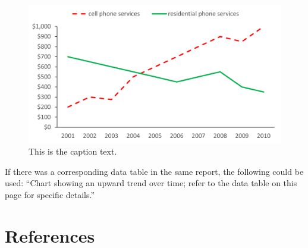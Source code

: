 \begin{figure}[H] 

 \tagpdfparaOff {}%
%
	\centering 	\includegraphics[width=6in]{Template-Fig-1.png}
  \tagmcend
 \tagstructend

	\caption{This is the caption text.}
	\label{fig:cellphone}

\end{figure}
 \tagpdfparaOn
If there was a corresponding data table in the same report, the following could be used: “Chart showing an upward trend over time; refer to the data table on this page for specific details.”
 


 \pagebreak
\tagpdfparaOff {}
\section*{References}
\tagmcend
 \tagstructend
{}
 \tagpdfparaOn


 

